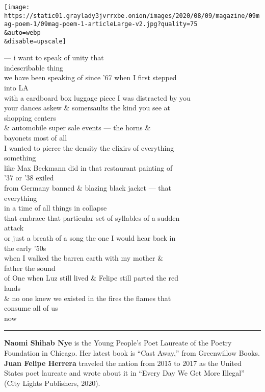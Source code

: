 \texttt{[image: https://static01.graylady3jvrrxbe.onion/images/2020/08/09/magazine/09mag-poem-1/09mag-poem-1-articleLarge-v2.jpg?quality=75\\\&auto=webp\\\&disable=upscale]}

 --- i want to speak of unity that\\
 indescribable thing\\
we have been speaking of since '67 when I first stepped\\
 into LA\\
with a cardboard box luggage piece I was distracted by you\\
your dances askew \& somersaults the kind you see at\\
 shopping centers\\
\& automobile super sale events --- the horns \&\\
 bayonets most of all\\
I wanted to pierce the density the elixirs of everything\\
 something\\
like Max Beckmann did in that restaurant painting of\\
 '37 or '38 exiled\\
from Germany banned \& blazing black jacket --- that\\
 everything\\
in a time of all things in collapse\\
that embrace that particular set of syllables of a sudden\\
 attack\\
or just a breath of a song the one I would hear back in\\
 the early '50s\\
when I walked the barren earth with my mother \&\\
 father the sound\\
of One when Luz still lived \& Felipe still parted the red\\
 lands\\
\& no one knew we existed in the fires the flames that\\
 consume all of us\\
now

\begin{center}\rule{0.5\linewidth}{\linethickness}\end{center}

\textbf{Naomi Shihab Nye} is the Young People's Poet Laureate of the
Poetry Foundation in Chicago. Her latest book is ``Cast Away,'' from
Greenwillow Books. \textbf{Juan Felipe Herrera} traveled the nation from
2015 to 2017 as the United States poet laureate and wrote about it in
``Every Day We Get More Illegal'' (City Lights Publishers, 2020).

